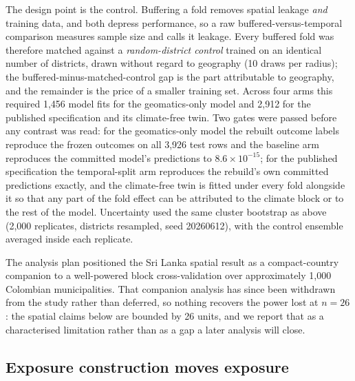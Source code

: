 The design point is the control. Buffering a fold removes spatial leakage \emph{and} training data, and both depress performance, so a raw buffered-versus-temporal comparison measures sample size and calls it leakage. Every buffered fold was therefore matched against a \emph{random-district control} trained on an identical number of districts, drawn without regard to geography (10 draws per radius); the buffered-minus-matched-control gap is the part attributable to geography, and the remainder is the price of a smaller training set. Across four arms this required 1{,}456 model fits for the geomatics-only model and 2{,}912 for the published specification and its climate-free twin. Two gates were passed before any contrast was read: for the geomatics-only model the rebuilt outcome labels reproduce the frozen outcomes on all 3{,}926 test rows and the baseline arm reproduces the committed model's predictions to $8.6\times10^{-15}$; for the published specification the temporal-split arm reproduces the rebuild's own committed predictions exactly, and the climate-free twin is fitted under every fold alongside it so that any part of the fold effect can be attributed to the climate block or to the rest of the model. Uncertainty used the same cluster bootstrap as above (2{,}000 replicates, districts resampled, seed 20260612), with the control ensemble averaged inside each replicate.

The analysis plan positioned the Sri Lanka spatial result as a compact-country companion to a well-powered block cross-validation over approximately 1{,}000 Colombian municipalities. That companion analysis has since been withdrawn from the study rather than deferred, so nothing recovers the power lost at $n=26$: the spatial claims below are bounded by 26 units, and we report that as a characterised limitation rather than as a gap a later analysis will close.


\subsection{Exposure construction moves exposure}
\label{sec:results-wp5-exposure}

